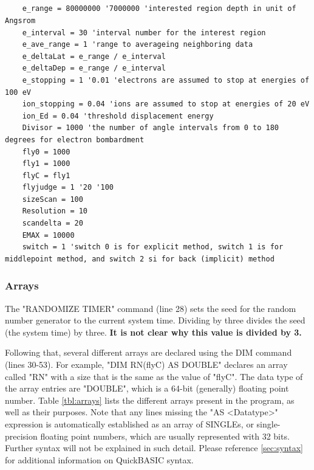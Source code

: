 \documentclass[10pt, reqno]{exam}
\begin{document}
\begin{verbatim}
    
    
    

    e_range = 80000000 '7000000 'interested region depth in unit of Angsrom
    e_interval = 30 'interval number for the interest region
    e_ave_range = 1 'range to averageing neighboring data
    e_deltaLat = e_range / e_interval
    e_deltaDep = e_range / e_interval
    e_stopping = 1 '0.01 'electrons are assumed to stop at energies of 100 eV
    ion_stopping = 0.04 'ions are assumed to stop at energies of 20 eV
    ion_Ed = 0.04 'threshold displacement energy
    Divisor = 1000 'the number of angle intervals from 0 to 180 degrees for electron bombardment
    fly0 = 1000
    fly1 = 1000
    flyC = fly1
    flyjudge = 1 '20 '100
    sizeScan = 100
    Resolution = 10
    scandelta = 20
    EMAX = 10000
    switch = 1 'switch 0 is for explicit method, switch 1 is for middlepoint method, and switch 2 si for back (implicit) method
\end{verbatim}
\subsubsection{Arrays}

The "RANDOMIZE TIMER" command (line 28) sets the seed for the random number generator to the current system time. Dividing by three divides the seed (the system time) by three. \textbf{It is not clear why this value is divided by 3.} \par

Following that, several different arrays are declared using the DIM command (lines 30-53). For example, "DIM RN(flyC) AS DOUBLE" declares an array called "RN" with a size that is the same as the value of "flyC". The data type of the array entries are "DOUBLE", which is a 64-bit (generally) floating point number. Table \ref{tbl:arrays} lists the different arrays present in the program, as well as their purposes. Note that any lines missing the "AS <Datatype>" expression is automatically established as an array of SINGLEs, or single-precision floating point numbers, which are usually represented with 32 bits. Further syntax will not be explained in such detail. Please reference \ref{sec:syntax} for additional information on QuickBASIC syntax. \par
\end{document}
